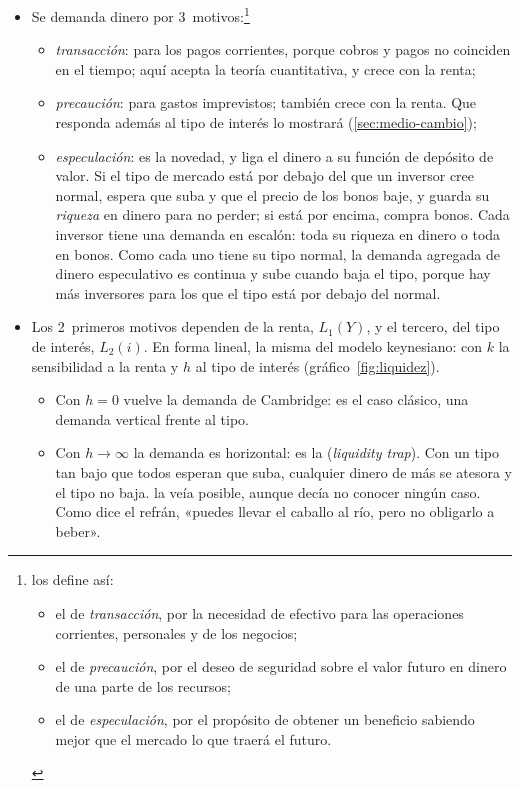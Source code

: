 \documentclass[11pt]{article}
\begin{document}
\begin{itemize}
\item Se demanda dinero por 3~motivos\nocite{Keynes1936}:\footnote{ los define así\nocite{Keynes1936}:
\begin{itemize}
\item el de \emph{transacción}, por la necesidad de efectivo para las operaciones corrientes, personales y de los negocios;
\item el de \emph{precaución}, por el deseo de seguridad sobre el valor futuro en dinero de una parte de los recursos;
\item el de \emph{especulación}, por el propósito de obtener un beneficio sabiendo mejor que el mercado lo que traerá el futuro.
\end{itemize}}
  \begin{itemize}
  \item \emph{transacción}: para los pagos corrientes, porque cobros y pagos no coinciden en el tiempo; aquí  acepta la teoría cuantitativa, y crece con la renta;
  \item \emph{precaución}: para gastos imprevistos; también crece con la renta. Que responda además al tipo de interés lo mostrará \textcite{Whalen1966Rationalization} (\ref{sec:medio-cambio});
  \item \emph{especulación}: es la novedad, y liga el dinero a su función de depósito de valor. Si el tipo de mercado está por debajo del que un inversor cree normal, espera que suba y que el precio de los bonos baje, y guarda su \emph{riqueza} en dinero para no perder; si está por encima, compra bonos. Cada inversor tiene una demanda en escalón: toda su riqueza en dinero o toda en bonos. Como cada uno tiene su tipo normal, la demanda agregada de dinero especulativo es continua y sube cuando baja el tipo, porque hay más inversores para los que el tipo está por debajo del normal\nocite{Laidler1993Demand}.
  \end{itemize}
\item Los 2~primeros motivos dependen de la renta, $L_1(Y)$, y el tercero, del tipo de interés, $L_2(i)$. En forma lineal, la misma del modelo keynesiano:
  con $k$ la sensibilidad a la renta y $h$ al tipo de interés (gráfico~\ref{fig:liquidez}).
  \begin{itemize}
  \item Con $h=0$ vuelve la demanda de Cambridge: es el caso clásico, una demanda vertical frente al tipo.
  \item Con $h\to\infty$ la demanda es horizontal: es la  (\emph{liquidity trap}). Con un tipo tan bajo que todos esperan que suba, cualquier dinero de más se atesora y el tipo no baja\nocite{Keynes1936}.  la veía posible, aunque decía no conocer ningún caso. Como dice el refrán, «puedes llevar el caballo al río, pero no obligarlo a beber».
  \end{itemize}
\end{itemize}
\end{document}
